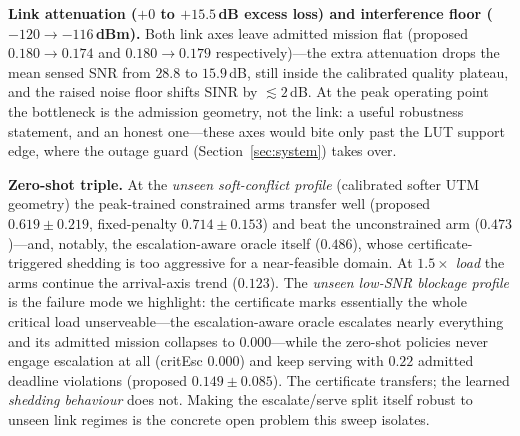 \textbf{Link attenuation ($+0$ to $+15.5$\,dB excess loss) and
interference floor ($-120\to-116$\,dBm).} Both link axes leave admitted
mission flat (proposed $0.180\to0.174$ and $0.180\to0.179$
respectively)---the extra attenuation drops the mean sensed SNR from
$28.8$ to $15.9$\,dB, still inside the calibrated quality plateau, and the
raised noise floor shifts SINR by $\lesssim\!2$\,dB. At the peak operating
point the bottleneck is the admission geometry, not the link: a useful
robustness statement, and an honest one---these axes would bite only past
the LUT support edge, where the outage guard (Section~\ref{sec:system})
takes over.

\textbf{Zero-shot triple.} At the \emph{unseen soft-conflict profile}
(calibrated softer UTM geometry) the peak-trained constrained arms
transfer well (proposed $0.619\pm0.219$, fixed-penalty $0.714\pm0.153$)
and beat the unconstrained arm ($0.473$)---and, notably, the
escalation-aware oracle itself ($0.486$), whose certificate-triggered
shedding is too aggressive for a near-feasible domain. At
\emph{$1.5\times$ load} the arms continue the arrival-axis trend
($0.123$). The \emph{unseen low-SNR blockage profile} is the failure
mode we highlight: the certificate marks essentially the whole critical
load unserveable---the escalation-aware oracle escalates nearly
everything and its admitted mission collapses to $0.000$---while the
zero-shot policies never engage escalation at all (critEsc $0.000$) and
keep serving with $0.22$ admitted deadline violations (proposed
$0.149\pm0.085$). The certificate transfers; the learned \emph{shedding
behaviour} does not. Making the escalate/serve split itself robust to
unseen link regimes is the concrete open problem this sweep isolates.



